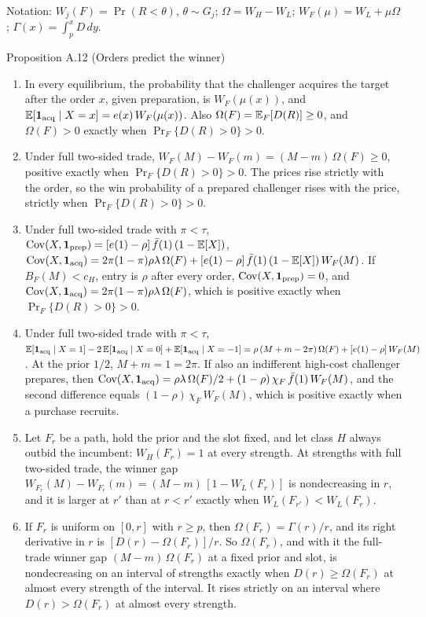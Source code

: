 Notation: \(W_j(F)=\Pr(R<\theta)\), \(\theta\sim G_j\); \(\Omega=W_H-W_L\); \(W_F(\mu)=W_L+\mu\Omega\); \(\Gamma(x)=\int_p^xD\,dy\).

{\small
\begin{paperresult}{Proposition A.12 (Orders predict the winner)}
\begin{enumerate}[label=(\roman*),leftmargin=2em,nosep]
\item In every equilibrium, the probability that the challenger acquires the target after the order \(x\), given preparation, is \(W_F(\mu(x))\), and \(\mathbb{E}[\mathbf{1}_{\rm acq}\mid X=x]=e(x)\,W_F(\mu(x))\). Also \(\Omega(F)=\mathbb{E}_F[D(R)]\ge0\), and \(\Omega(F)>0\) exactly when \(\Pr_F\{D(R)>0\}>0\).
\item Under full two-sided trade, \(W_F(M)-W_F(m)=(M-m)\,\Omega(F)\ge0\), positive exactly when \(\Pr_F\{D(R)>0\}>0\). The prices rise strictly with the order, so the win probability of a prepared challenger rises with the price, strictly when \(\Pr_F\{D(R)>0\}>0\).
\item Under full two-sided trade with \(\pi<\tau\),
\(\operatorname{Cov}(X,\mathbf{1}_{\rm prep})=[e(1)-\rho]\,\bar f(1)\,(1-\mathbb{E}[X])\),
\(\operatorname{Cov}(X,\mathbf{1}_{\rm acq})=2\pi(1-\pi)\rho\lambda\,\Omega(F)+[e(1)-\rho]\,\bar f(1)\,(1-\mathbb{E}[X])\,W_F(M)\).
If \(B_F(M)<c_H\), entry is \(\rho\) after every order, \(\operatorname{Cov}(X,\mathbf{1}_{\rm prep})=0\), and \(\operatorname{Cov}(X,\mathbf{1}_{\rm acq})=2\pi(1-\pi)\rho\lambda\,\Omega(F)\), which is positive exactly when \(\Pr_F\{D(R)>0\}>0\).
\item Under full two-sided trade with \(\pi<\tau\),
\(\mathbb{E}[\mathbf{1}_{\rm acq}\mid X=1]-2\,\mathbb{E}[\mathbf{1}_{\rm acq}\mid X=0]+\mathbb{E}[\mathbf{1}_{\rm acq}\mid X=-1]=\rho\,(M+m-2\pi)\,\Omega(F)+[e(1)-\rho]\,W_F(M)\).
At the prior \(1/2\), \(M+m=1=2\pi\). If also an indifferent high-cost challenger prepares, then \(\operatorname{Cov}(X,\mathbf{1}_{\rm acq})=\rho\lambda\,\Omega(F)/2+(1-\rho)\,\chi_F\,\bar f(1)\,W_F(M)\), and the second difference equals \((1-\rho)\,\chi_F\,W_F(M)\), which is positive exactly when a purchase recruits.
\item Let \(F_r\) be a path, hold the prior and the slot fixed, and let class \(H\) always outbid the incumbent: \(W_H(F_r)=1\) at every strength. At strengths with full two-sided trade, the winner gap \(W_{F_r}(M)-W_{F_r}(m)=(M-m)\,[1-W_L(F_r)]\) is nondecreasing in \(r\), and it is larger at \(r'\) than at \(r<r'\) exactly when \(W_L(F_{r'})<W_L(F_r)\).
\item If \(F_r\) is uniform on \([0,r]\) with \(r\ge p\), then \(\Omega(F_r)=\Gamma(r)/r\), and its right derivative in \(r\) is \([D(r)-\Omega(F_r)]/r\). So \(\Omega(F_r)\), and with it the full-trade winner gap \((M-m)\,\Omega(F_r)\) at a fixed prior and slot, is nondecreasing on an interval of strengths exactly when \(D(r)\ge\Omega(F_r)\) at almost every strength of the interval. It rises strictly on an interval where \(D(r)>\Omega(F_r)\) at almost every strength.
\end{enumerate}
\end{paperresult}}

